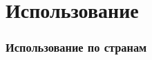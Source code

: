 \section{Использование}

\begin{frame}
    \frametitle{Использование по странам}
    \begin{center}
    
    \end{center}
\end{frame}